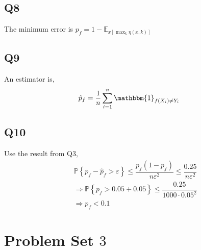\documentclass{article}
\begin{document}
\subsection{Q8}
The minimum error is $p_{f} = 1 - \mathbb{E}_{x\left[\displaystyle\max_{k} \eta\left(x, k\right)\right]}$



\subsection{Q9}
An estimator is,
\begin{align*}
\hat{p}_{f} &= \dfrac{1}{n} \displaystyle\sum_{i=1}^{n} \mathbbm{1}_{f\left(X_{i}\right) \neq  Y_{i}}
\end{align*}


\subsection{Q10}
Use the result from Q3,
\begin{align*}
&  \mathbb{P}\left\{p_{f} - \hat{p}_{f} > \varepsilon\right\} \leq  \dfrac{p_{f} \left(1 - p_{f}\right)}{n \varepsilon^{2}} \leq  \dfrac{0.25}{n \varepsilon^{2}}
\\ &\Rightarrow  \mathbb{P}\left\{p_{f} > 0.05 + 0.05\right\} \leq  \dfrac{0.25}{1000 \cdot  0.05^{2}}
\\ &\Rightarrow  p_{f} < 0.1
\end{align*}





\section{Problem Set $3$} 
\end{document}
